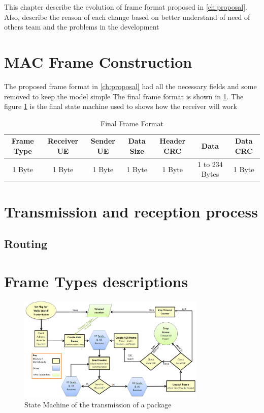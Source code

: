 This chapter describe the evolution of frame format proposed in \ref{ch:proposal}. Also, describe the reason
 of each change based on better understand of need of others team and the problems in the development


\section{MAC Frame Construction}
The proposed frame format in \ref{ch:proposal} had all the necessary fields and some removed to keep the model simple
The final frame format is  shown in \ref{tab:finalFrame}.
The figure \ref{fig:stateMachine} is the final state machine used to shows how the receiver will work

\begin{table}
\begin{tabular}{| c | c | c | c | c | c | c | }
  \hline                       
  Frame Type & Receiver UE & Sender UE & Data Size & Header CRC & Data & Data CRC\\
  \hline
	1 Byte & 1 Byte & 1 Byte & 1 Byte & 1 Byte & 1 to 234 Bytes & 1 Byte\\
  
  \hline  
\end{tabular}
 \caption{Final Frame Format}
	\label{tab:finalFrame}
\end{table}

\section{Transmission and reception process}



\subsection {Routing}

\section{Frame Types descriptions}


\begin{figure}[p]
    \centering
    \includegraphics[width=0.8\textwidth]{State_Machine_yellow.PNG}
    \caption{State Machine of the transmission of a package }
    \label{fig:stateMachine}
\end{figure}


